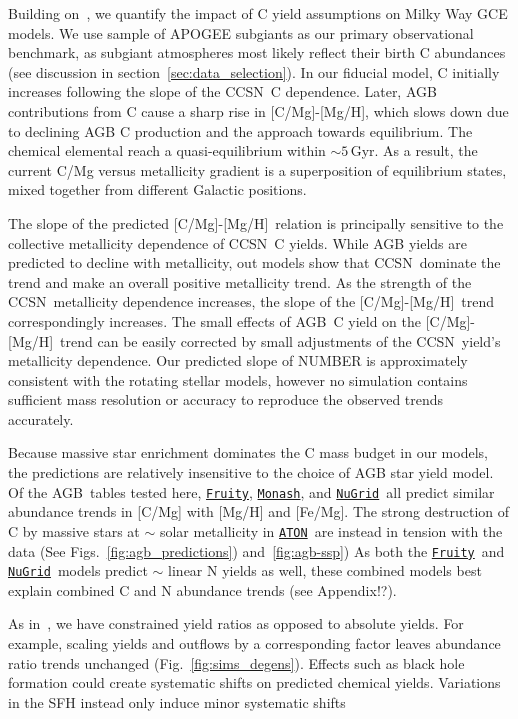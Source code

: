 \documentclass[fleqn,
usenatbib]{mnras}
\makeatletter
\newcommand{\fruity}{\texttt{\hyperlink{fruity}{Fruity}}}
\newcommand{\nugrid}{\texttt{\hyperlink{nugrid}{NuGrid}}}
\newcommand{\monash}{\texttt{\hyperlink{monash}{Monash}}}
\newcommand{\aton}{\texttt{\hyperlink{aton}{ATON}}}
\newcommand{\agb}{AGB}
\newcommand{\cc}{CCSN}
\newcommand{\caah}{[C/Mg]-[Mg/H]}
\newcommand{\about}[1]{${\sim} #1$}
\DeclareRobustCommand\citepos
  {\begingroup
   \let\NAT@nmfmt\NAT@posfmt%
   \NAT@swafalse\let\NAT@ctype\z@\NAT@partrue
   \@ifstar{\NAT@fulltrue\NAT@citetp}{\NAT@fullfalse\NAT@citetp}}
\let\NAT@orig@nmfmt\NAT@nmfmt
\def\NAT@posfmt#1{\NAT@orig@nmfmt{#1's}}
\makeatother
\begin{document}
Building on~\citet{james+23}, we quantify the impact of C yield assumptions on Milky Way GCE models. We use \citepos{jack} sample of APOGEE subgiants as our primary observational benchmark, as subgiant atmospheres most likely reflect their birth C abundances (see discussion in section~\ref{sec:data_selection}).
In our fiducial model, C initially increases following the slope of the \cc\ C dependence. Later, AGB contributions from C cause a sharp rise in \caah, which slows down due to declining AGB C production and the approach towards equilibrium. The chemical elemental reach a quasi-equilibrium within \about{5}\,Gyr. As a result, the current C/Mg versus metallicity gradient is a superposition of equilibrium states, mixed together from different Galactic positions.


The slope of the predicted \caah\ relation is principally sensitive to the collective metallicity dependence of \cc\ C yields.
While AGB yields are predicted to decline with metallicity, out models show that \cc\ dominate the trend and make an overall positive metallicity trend. 
As the strength of the \cc\ metallicity dependence increases, the slope of the \caah\ trend correspondingly increases. The small effects of \agb\ C yield on the \caah\ trend can be easily corrected by small adjustments of the \cc\ yield's metallicity dependence.
Our predicted slope of NUMBER is approximately consistent with the \citet{LC18} rotating stellar models, however no simulation contains sufficient mass resolution or accuracy to reproduce the observed trends accurately. 

Because massive star enrichment dominates the C mass budget in our models, the predictions are relatively insensitive to the choice of AGB star yield model.
Of the \agb\ tables tested here, \fruity, \monash, and \nugrid\ all predict similar abundance trends in [C/Mg] with [Mg/H] and [Fe/Mg]. The strong destruction of C by massive stars at \about{} solar metallicity   in \aton\ are instead in tension with the data (See Figs.~\ref{fig:agb_predictions})  and~\ref{fig:agb-ssp})
As both the \fruity\ and \nugrid\ models predict \about{} linear N yields as well, these combined models best explain combined C and N abundance trends (see Appendix!?).

As in~\citet{james+23}, we have constrained yield ratios as opposed to absolute yields. For example, scaling yields and outflows by a corresponding factor leaves abundance ratio trends unchanged (Fig.~\ref{fig:sims_degens}).  Effects such as black hole formation could create systematic shifts on predicted chemical yields.
Variations in the SFH instead only induce minor systematic shifts
\end{document}
